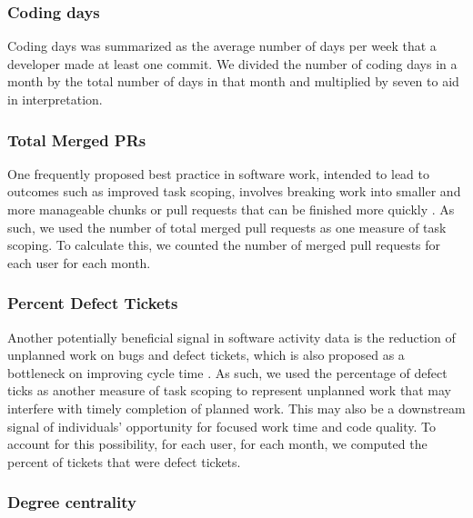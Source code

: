 \documentclass[
  sn-mathphys-ay,
]{sn-jnl}
\begin{document}
\subsubsection{Coding days}\label{coding-days}

Coding days was summarized as the average number of days per week that a
developer made at least one commit. We divided the number of coding days
in a month by the total number of days in that month and multiplied by
seven to aid in interpretation.

\subsubsection{Total Merged PRs}\label{total-merged-prs}

One frequently proposed best practice in software work, intended to lead
to outcomes such as improved task scoping, involves breaking work into
smaller and more manageable chunks or pull requests that can be finished
more quickly
\citep{kudrjavetsSmallCodeChanges2022, linesWhyEliteDev2023, riosaWrittenUnwrittenGuide2019, zhangPullRequestLatency2022}.
As such, we used the number of total merged pull requests as one measure
of task scoping. To calculate this, we counted the number of merged pull
requests for each user for each month.

\subsubsection{Percent Defect Tickets}\label{percent-defect-tickets}

Another potentially beneficial signal in software activity data is the
reduction of unplanned work on bugs and defect tickets, which is also
proposed as a bottleneck on improving cycle time
\citep{paudelMeasuringImpactTechnical2024, paudelMeasuringImpactTechnical2024, rosserSystemsPerspectiveTechnical2021, toxboeCycleTime2023}.
As such, we used the percentage of defect ticks as another measure of
task scoping to represent unplanned work that may interfere with timely
completion of planned work. This may also be a downstream signal of
individuals' opportunity for focused work time and code quality. To
account for this possibility, for each user, for each month, we computed
the percent of tickets that were defect tickets.

\subsubsection{Degree centrality}\label{degree-centrality}
\end{document}
